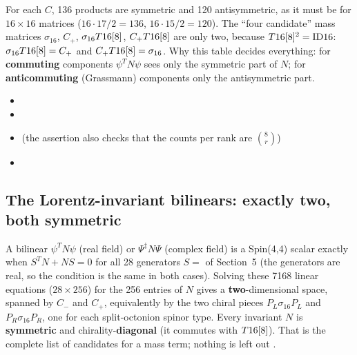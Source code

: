 For each $C$, 136 products are symmetric and 120 antisymmetric, as it must be for $16\times16$
matrices ($16\cdot17/2=136$, $16\cdot15/2=120$). The ``four candidate'' mass matrices
$\sigma_{16}$, $C_+$, $\sigma_{16}T16[8]$, $C_+T16[8]$ are only two, because
$T16[8]^2=\mathrm{ID16}$: $\sigma_{16}T16[8]=C_+$ and $C_+T16[8]=\sigma_{16}$. Why this table decides
everything: for \textbf{commuting} components $\psi^{T}N\psi$ sees only the symmetric part of $N$;
for \textbf{anticommuting} (Grassmann) components only the antisymmetric part.

\begin{itemize}
  \item {}
  \item {}
  \item {} (the assertion also checks that the
        counts per rank are $\binom{8}{r}$)
  \item {}
\end{itemize}

\subsection{The Lorentz-invariant bilinears: exactly two, both symmetric}
\label{sec:3.2}

A bilinear $\psi^{T}N\psi$ (real field) or $\Psi^{\ddagger}N\Psi$ (complex field) is a Spin(4,4)
scalar exactly when $S^{T}N+NS=0$ for all 28 generators $S=$  of Section~5 (the
generators are real, so the condition is the same in both cases). Solving these 7168 linear
equations ($28\times256$) for the 256 entries of $N$ gives a \textbf{two}-dimensional space, spanned
by $C_-$ and $C_+$, equivalently by the two chiral pieces $P_L\sigma_{16}P_L$ and
$P_R\sigma_{16}P_R$, one for each split-octonion spinor type. Every invariant $N$ is
\textbf{symmetric} and chirality-\textbf{diagonal} (it commutes with $T16[8]$). That is the
complete list of candidates for a mass term; nothing is left out .

